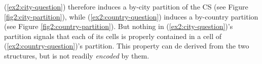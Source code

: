 \begin{exe}
	\ex 
	\begin{xlist}
		\label{ex2:city-partition}
		\label{ex2:country-partition}
	\end{xlist}
\end{exe}

(\ref{ex2:city-question}) therefore induces a by-city partition of the CS (see Figure \ref{fig2:city-partition}), while (\ref{ex2:country-question}) induces a by-country partition (see Figure \ref{fig2:country-partition}). But nothing in (\ref{ex2:city-question})'s partition signals that each of its cells is properly contained in a cell of (\ref{ex2:country-question})'s partition. This property can de derived from the two structures, but is not readily \textit{encoded} by them.



